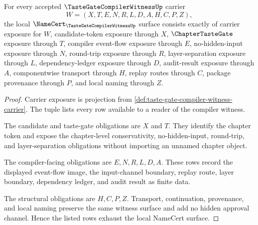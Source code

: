 \begin{theorem}
\label{thm:taste-gate-compiler-witness-namecert-obligations}
For every accepted $\TasteGateCompilerWitnessUp$ carrier
$$
W=(X,T,E,N,R,L,D,A,H,C,P,Z),
$$
the local $\NameCert_{\TasteGateCompilerWitnessUp}$ surface consists exactly of carrier exposure for $W$, candidate-token exposure through $X$, $\ChapterTasteGate$ exposure through $T$, compiler event-flow exposure through $E$, no-hidden-input exposure through $N$, round-trip exposure through $R$, layer-separation exposure through $L$, dependency-ledger exposure through $D$, audit-result exposure through $A$, componentwise transport through $H$, replay routes through $C$, package provenance through $P$, and local naming through $Z$.
\end{theorem}
\begin{proof}
Carrier exposure is projection from \autoref{def:taste-gate-compiler-witness-carrier}. The tuple lists every row available to a reader of the compiler witness.

The candidate and taste-gate obligations are $X$ and $T$. They identify the chapter token and expose the chapter-level conservativity, no-hidden-input, round-trip, and layer-separation obligations without importing an unnamed chapter object.

The compiler-facing obligations are $E,N,R,L,D,A$. These rows record the displayed event-flow image, the input-channel boundary, replay route, layer boundary, dependency ledger, and audit result as finite data.

The structural obligations are $H,C,P,Z$. Transport, continuation, provenance, and local naming preserve the same witness surface and add no hidden approval channel. Hence the listed rows exhaust the local NameCert surface.
\end{proof}

